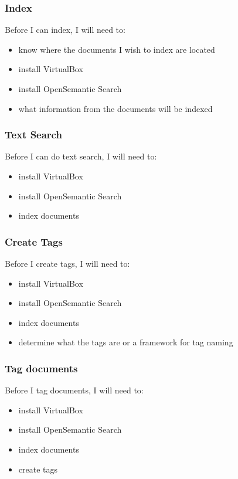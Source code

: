 \documentclass{article}
\begin{document}
\subsubsection*{Index}

Before I can index, I will need to:\begin{itemize}
\item know where the documents I wish to index are located
\item install VirtualBox
\item install OpenSemantic Search
\item what information from the documents will be indexed
\end{itemize}

\subsubsection*{Text Search}
Before I can do text search, I will need to:\begin{itemize}
\item install VirtualBox
\item install OpenSemantic Search
\item index documents
\end{itemize}

\subsubsection*{Create Tags}

Before I create tags, I will need to:
\begin{itemize}
\item install VirtualBox
\item install OpenSemantic Search
\item index documents
\item determine what the tags are or a framework for tag naming
\end{itemize}

\subsubsection*{Tag documents}

Before I tag documents, I will need to:
\begin{itemize}
\item install VirtualBox
\item install OpenSemantic Search
\item index documents
\item create tags
\end{itemize}
\end{document}
